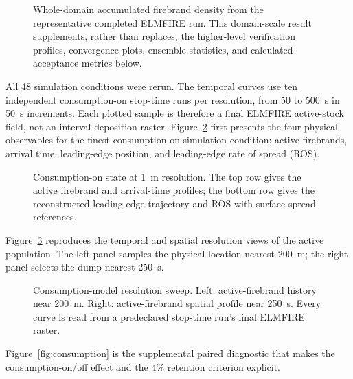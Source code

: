 \begin{figure}[H]
\centering
{}
\caption{Whole-domain accumulated firebrand density from the representative completed ELMFIRE run.  This
domain-scale result supplements, rather than replaces, the higher-level verification
profiles, convergence plots, ensemble statistics, and calculated acceptance metrics below.}
\label{fig:domain-result}
\end{figure}

All 48 simulation conditions were rerun. The temporal curves use ten independent
consumption-on stop-time runs per resolution, from 50 to 500~s in 50~s
increments. Each plotted sample is therefore a final ELMFIRE active-stock
field, not an interval-deposition raster. Figure~\ref{fig:consumption-state}
first presents the four physical observables for the finest consumption-on
simulation condition: active firebrands, arrival time, leading-edge position, and
leading-edge rate of spread (ROS).

\begin{figure}[H]
\centering
{}
\caption{Consumption-on state at 1~m resolution. The top row gives the active
firebrand and arrival-time profiles; the bottom row gives the reconstructed
leading-edge trajectory and ROS with surface-spread references.}
\label{fig:consumption-state}
\end{figure}

Figure~\ref{fig:consumption-convergence} reproduces the temporal and spatial
resolution views of the active population. The left panel samples the physical
location nearest 200~m; the right panel selects the dump nearest 250~s.

\begin{figure}[H]
\centering
{}
\caption{Consumption-model resolution sweep. Left: active-firebrand history
near 200~m. Right: active-firebrand spatial profile near 250~s. Every curve is
read from a predeclared stop-time run's final ELMFIRE raster.}
\label{fig:consumption-convergence}
\end{figure}

Figure~\ref{fig:consumption} is the supplemental paired diagnostic that makes
the consumption-on/off effect and the 4\% retention criterion explicit.

